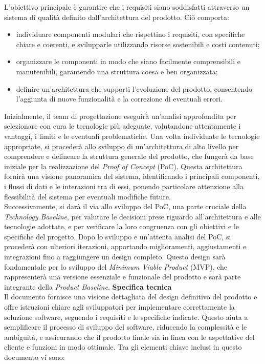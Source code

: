 L'obiettivo principale è garantire che i requisiti siano soddisfatti attraverso un sistema di qualità definito dall'architettura del prodotto. Ciò comporta:
\begin{itemize}
	\item individuare componenti modulari che rispettino i requisiti, con specifiche chiare e coerenti, e svilupparle utilizzando risorse sostenibili e costi contenuti;
	\item organizzare le componenti in modo che siano facilmente comprensibili e manutenibili, garantendo una struttura coesa e ben organizzata;
	\item definire un'architettura che supporti l'evoluzione del prodotto, consentendo l'aggiunta di nuove funzionalità e la correzione di eventuali errori.
\end{itemize}
Inizialmente, il team di progettazione eseguirà un'analisi approfondita per selezionare con cura le tecnologie più adeguate, valutandone attentamente i vantaggi, i limiti e le eventuali problematiche. Una volta individuate le tecnologie appropriate, si procederà allo sviluppo di un'architettura di alto livello per comprendere e delineare la struttura generale del prodotto, che fungerà da base iniziale per la realizzazione del \textit{Proof of Concept} (PoC). Questa architettura fornirà una visione panoramica del sistema, identificando i principali componenti, i flussi di dati e le interazioni tra di essi, ponendo particolare attenzione alla flessibilità del sistema per eventuali modifiche future. \\Successivamente, si darà il via allo sviluppo del PoC, una parte cruciale della \textit{Technology Baseline}, per valutare le decisioni prese riguardo all'architettura e alle tecnologie adottate, e per verificare la loro congruenza con gli obiettivi e le specifiche del progetto. Dopo lo sviluppo e un'attenta analisi del PoC, si procederà con ulteriori iterazioni, apportando miglioramenti, aggiustamenti e integrazioni fino a raggiungere un design completo. Questo design sarà fondamentale per lo sviluppo del \textit{Minimum Viable Product} (MVP), che rappresenterà una versione essenziale e funzionale del prodotto e sarà parte integrante della \textit{Product Baseline}.
\newpage
{}
\textbf{Specifica tecnica}\\ Il documento fornisce una visione dettagliata del design definitivo del prodotto e offre istruzioni chiare agli sviluppatori per implementare correttamente la soluzione software, seguendo i requisiti e le specifiche indicate. Questo aiuta a semplificare il processo di sviluppo del software, riducendo la complessità e le ambiguità, e assicurando che il prodotto finale sia in linea con le aspettative del cliente e funzioni in modo ottimale. Tra gli elementi chiave inclusi in questo documento vi sono:
